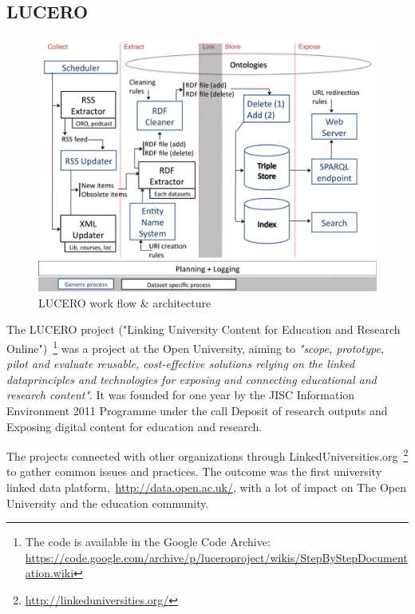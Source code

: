 \subsection{LUCERO}


\begin{figure}[htbp]
	\centering
\includegraphics[width=\textwidth]{img/lucero_architecture.png}
	\caption{LUCERO work flow \& architecture}
	\label{lucero_architecture}
\end{figure}

The LUCERO project ("Linking University Content for Education and Research Online")~\footnote{The code is available in the Google Code Archive: \url{https://code.google.com/archive/p/luceroproject/wikis/StepByStepDocumentation.wiki}} was a project at the Open University, aiming to \emph{"scope, prototype, pilot and evaluate reusable, cost-effective solutions relying on the linked dataprinciples and technologies for exposing and connecting educational and research content"}. It was founded for one year by the JISC Information Environment 2011 Programme under the call Deposit of research outputs and Exposing digital content for education and research.~\cite{lucero:about}

The projects connected with other organizations through LinkedUniversities.org~\footnote{\url{http://linkeduniversities.org/}} to gather common issues and practices. The outcome was the first university linked data platform,~\url{http://data.open.ac.uk/}, with a lot of impact on The Open University and the education community.

